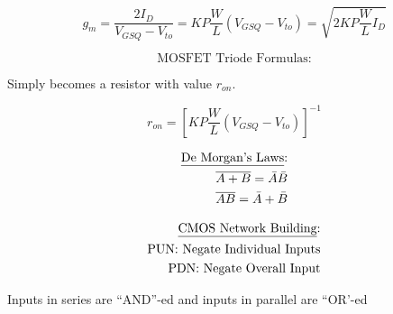 \documentclass[12pt]{article}
\begin{document}
  $$g_m=\frac{2I_D}{V_{GSQ}-V_{to}}=KP\frac{W}{L}(V_{GSQ}-V_{to})=\sqrt{2KP\frac{W}{L}I_D}$$

  \begin{multicols}{2}

  \begin{center}
    $$\boxed{\text{MOSFET Triode Formulas:}}$$
  \end{center}

    Simply becomes a resistor with value $r_{on}$.

    $$r_{on}=\left[KP\frac{W}{L}(V_{GSQ}-V_{to})\right]^{-1}$$

  \end{multicols}

  \begin{multicols}{2}

    \begin{equation*}
      \begin{split}
      \text{\underline{De Morgan's Laws}:}\\
      \overline{A+B}=\bar{A}\bar{B}\\
      \overline{AB}=\bar{A}+\bar{B}\\
      \end{split}
    \end{equation*}

    \begin{equation*}
      \begin{split}
      \text{\underline{CMOS Network Building}:}\\
      \text{PUN: Negate Individual Inputs}\\
      \text{PDN: Negate Overall Input}\\
      \end{split}
    \end{equation*}

  \end{multicols}

  \begin{center}
    Inputs in series are “AND”-ed and inputs in parallel are “OR'-ed
  \end{center}
\end{document}
